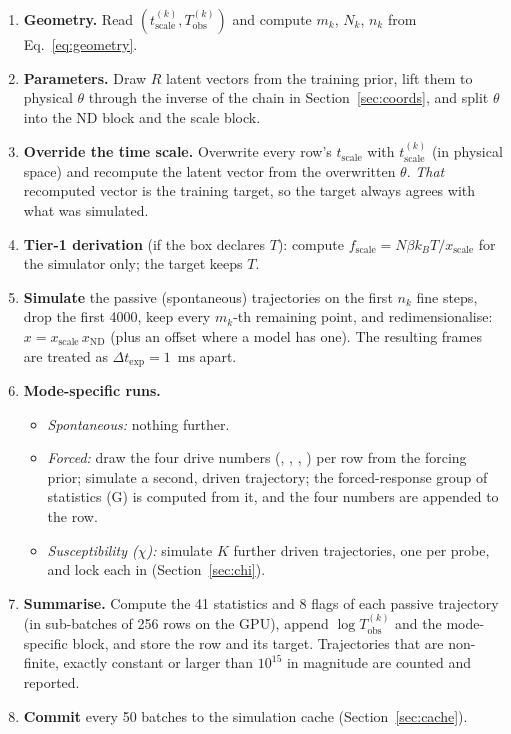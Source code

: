 \documentclass[10pt,a4paper]{article}
\newcommand{\code}[1]{\texttt{\detokenize{#1}}}
\newcommand{\Tobs}{T_{\mathrm{obs}}}
\newcommand{\tscale}{t_{\mathrm{scale}}}
\newcommand{\xscale}{x_{\mathrm{scale}}}
\newcommand{\fscale}{f_{\mathrm{scale}}}
\begin{document}
\begin{enumerate}
  \item \textbf{Geometry.} Read $(\tscale^{(k)},\Tobs^{(k)})$ and compute $m_k$, $N_k$, $n_k$ from
        Eq.~\eqref{eq:geometry}.
  \item \textbf{Parameters.} Draw $R$ latent vectors from the training prior, lift them to physical $\theta$
        through the inverse of the chain in Section~\ref{sec:coords}, and split $\theta$ into the ND block and the
        scale block.
  \item \textbf{Override the time scale.} Overwrite every row's $\tscale$ with $\tscale^{(k)}$ (in physical
        space) and recompute the latent vector from the overwritten $\theta$. \emph{That} recomputed vector is the
        training target, so the target always agrees with what was simulated.
  \item \textbf{Tier-1 derivation} (if the box declares $T$): compute $\fscale=N\beta k_BT/\xscale$ for the
        simulator only; the target keeps $T$.
  \item \textbf{Simulate} the passive (spontaneous) trajectories on the first $n_k$ fine steps, drop the first 4000,
        keep every $m_k$-th remaining point, and redimensionalise: $x=\xscale\,x_{\mathrm{ND}}$ (plus an offset where
        a model has one). The resulting frames are treated as $\Delta t_{\exp}=1$~ms apart.
  \item \textbf{Mode-specific runs.}
        \begin{itemize}
          \item \emph{Spontaneous:} nothing further.
          \item \emph{Forced:} draw the four drive numbers (\code{amp}, \code{freq}, \code{phase}, \code{offset})
                per row from the forcing prior; simulate a second, driven trajectory; the forced-response group of
                statistics (G) is computed from it, and the four numbers are appended to the row.
          \item \emph{Susceptibility ($\chi$):} simulate $K$ further driven trajectories, one per probe, and lock
                each in (Section~\ref{sec:chi}).
        \end{itemize}
  \item \textbf{Summarise.} Compute the 41 statistics and 8 flags of each passive trajectory (in sub-batches of 256
        rows on the GPU), append $\log\Tobs^{(k)}$ and the mode-specific block, and store the row and its target.
        Trajectories that are non-finite, exactly constant or larger than $10^{15}$ in magnitude are counted and
        reported.
  \item \textbf{Commit} every 50 batches to the simulation cache (Section~\ref{sec:cache}).
\end{enumerate}
\end{document}
